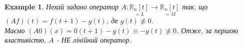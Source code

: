 \documentclass[a4paper, 10pt]{article}
\def\huge{\displaystyle}
\theoremstyle{theoremdd}
\theoremstyle{theoremdd}
\theoremstyle{theoremdd}
\theoremstyle{theoremdd}
\newtheorem{example}[theorem]{Example}
\theoremstyle{theoremdd}
\theoremstyle{theoremdd}
\theoremstyle{theoremdd}
\theoremstyle{theoremdd}
\begin{document}
	\iffalse
	\begin{example}
	Нехай задано оператор $A: \underset{=L}{\mathbb{R}^2} \to \underset{=M}{\mathbb{R}^2}$.\\
	$\huge A\vec{x} = \begin{pmatrix} x_1 + x_2 + 3 \\ x_1 -x_2 \end{pmatrix}$\\
	$A(\vec{0}) = \begin{pmatrix} 3 \\ 0 \end{pmatrix} \neq \vec{0}$.\\
	Отже, за другою властивістю, $A$ - НЕ лінійний оператор.
	\end{example}
	\fi
	
	\begin{example}
	Нехай задано оператор $A: \underset{=L}{\mathbb{R}_n[t]} \to \underset{=M}{\mathbb{R}_n[t]}$ так, що \\ $(Af)(t) = f(t+1) - g(t)$, де $g(t) \not\equiv 0$.\\
	Маємо $(A0)(x) = 0(t+1) - g(t) \equiv -g(t) \not\equiv 0$. Отже, за першою властивістю, $A$ - НЕ лінійний оператор.
	\end{example}
	
\end{document}
